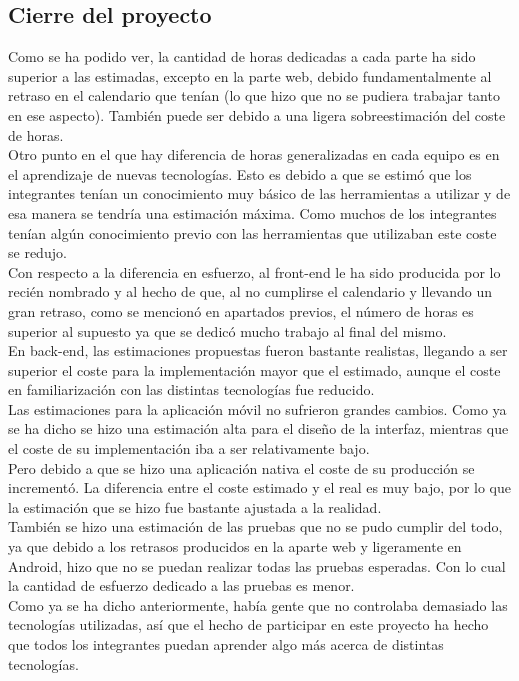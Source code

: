 \documentclass{article}
\begin{document}
\subsection{Cierre del proyecto}
Como se ha podido ver, la cantidad de horas dedicadas a cada parte ha sido superior a las estimadas, excepto en la parte web, debido fundamentalmente al retraso en el calendario que tenían (lo que hizo que no se pudiera trabajar tanto en ese aspecto). También puede ser debido a una ligera sobreestimación del coste de horas.\\
\hfill \break
Otro punto en el que hay diferencia de horas generalizadas en cada equipo es en el aprendizaje de nuevas tecnologías. Esto es debido a que se estimó que los integrantes tenían un conocimiento muy básico de las herramientas a utilizar y de esa manera se tendría una estimación máxima. Como muchos de los integrantes tenían algún conocimiento previo con las herramientas que utilizaban este coste se redujo.  \\
\hfill \break
Con respecto a la diferencia en esfuerzo, al front-end le ha sido producida por lo recién nombrado y al hecho de que, al no cumplirse el calendario y llevando un gran retraso, como se mencionó en apartados previos, el número de horas es superior al supuesto ya que se dedicó mucho trabajo al final del mismo.\\
\hfill \break
En back-end, las estimaciones propuestas fueron bastante realistas, llegando a ser superior el coste para la implementación mayor que el estimado, aunque el coste en familiarización con las distintas tecnologías fue reducido.\\
\hfill \break 
Las estimaciones para la aplicación móvil no sufrieron grandes cambios. Como ya se ha dicho se hizo una estimación alta para el diseño de la interfaz, mientras que el coste de su implementación iba a ser relativamente bajo. \\
Pero debido a que se hizo una aplicación nativa el coste de su producción se incrementó. La diferencia entre el coste estimado y el real es muy bajo, por lo que la estimación que se hizo fue bastante ajustada a la realidad. \\
\hfill \break
También se hizo una estimación de las pruebas que no se pudo cumplir del todo, ya que debido a los retrasos producidos en la aparte web y ligeramente en Android, hizo que no se puedan realizar todas las pruebas esperadas. Con lo cual la cantidad de esfuerzo dedicado a las pruebas es menor.\\
Como ya se ha dicho anteriormente, había gente que no controlaba demasiado las tecnologías utilizadas, así que el hecho de participar en este proyecto ha hecho que todos los integrantes puedan aprender algo más acerca de distintas tecnologías. \\
\end{document}

